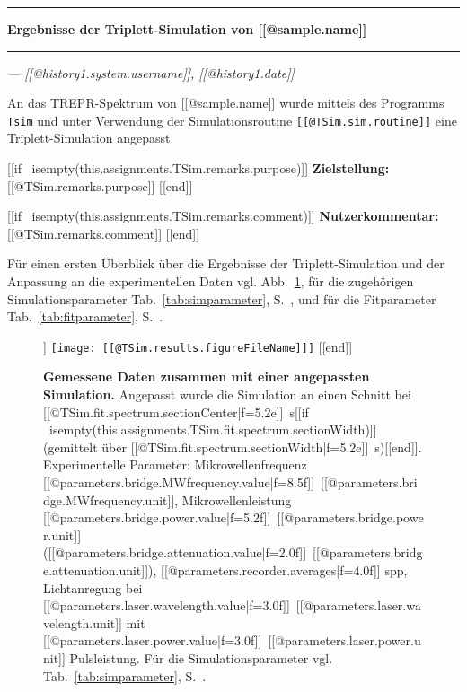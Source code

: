 \documentclass{article}
\begin{document}
\thispagestyle{empty}

\vspace*{-1.5cm}

\noindent\rule[1.5ex]{\textwidth}{1pt}

\begin{sffamily}\bfseries\large
Ergebnisse der Triplett-Simulation von [[@sample.name]]
\end{sffamily}

\noindent\rule{\textwidth}{1pt}

\begin{flushright}\slshape
--- [[@history{1}.system.username]], [[@history{1}.date]]
\end{flushright}

\vspace*{1.5em}

An das TREPR-Spektrum von [[@sample.name]] wurde mittels des Programms \texttt{Tsim} und unter Verwendung der Simulationsroutine \texttt{[[@TSim.sim.routine]]} eine Triplett-Simulation angepasst.

[[if ~isempty(this.assignments.TSim.remarks.purpose)]]
\textbf{Zielstellung:} [[@TSim.remarks.purpose]]
[[end]]

[[if ~isempty(this.assignments.TSim.remarks.comment)]]
\textbf{Nutzerkommentar:} [[@TSim.remarks.comment]]
[[end]]

Für einen ersten Überblick über die Ergebnisse der Triplett-Simulation und der Anpassung an die experimentellen Daten vgl. Abb.~\ref{fig:ergebnisse}, für die zugehörigen Simulationsparameter Tab.~\ref{tab:simparameter}, S.~\pageref{tab:simparameter}, und für die Fitparameter Tab.~\ref{tab:fitparameter}, S.~\pageref{tab:fitparameter}.


\begin{figure}[h]
\centering
[[if ~isempty(this.assignments.TSim.results.figureFileName)]]
\texttt{[image: [[@TSim.results.figureFileName]]]}
[[end]]
\caption{\textbf{Gemessene Daten zusammen mit einer angepassten Simulation.} Angepasst wurde die Simulation an einen Schnitt bei [[@TSim.fit.spectrum.sectionCenter|f=5.2e]]~s[[if ~isempty(this.assignments.TSim.fit.spectrum.sectionWidth)]] (gemittelt über [[@TSim.fit.spectrum.sectionWidth|f=5.2e]]~s)[[end]]. Experimentelle Parameter: Mikrowellenfrequenz [[@parameters.bridge.MWfrequency.value|f=8.5f]]~[[@parameters.bridge.MWfrequency.unit]], Mikrowellenleistung [[@parameters.bridge.power.value|f=5.2f]]~[[@parameters.bridge.power.unit]] ([[@parameters.bridge.attenuation.value|f=2.0f]]~[[@parameters.bridge.attenuation.unit]]), [[@parameters.recorder.averages|f=4.0f]] spp, Lichtanregung bei [[@parameters.laser.wavelength.value|f=3.0f]]~[[@parameters.laser.wavelength.unit]] mit [[@parameters.laser.power.value|f=3.0f]]~[[@parameters.laser.power.unit]] Pulsleistung. Für die Simulationsparameter vgl. Tab.~\ref{tab:simparameter}, S.~\pageref{tab:simparameter}.}
\label{fig:ergebnisse}
\end{figure}
\end{document}

